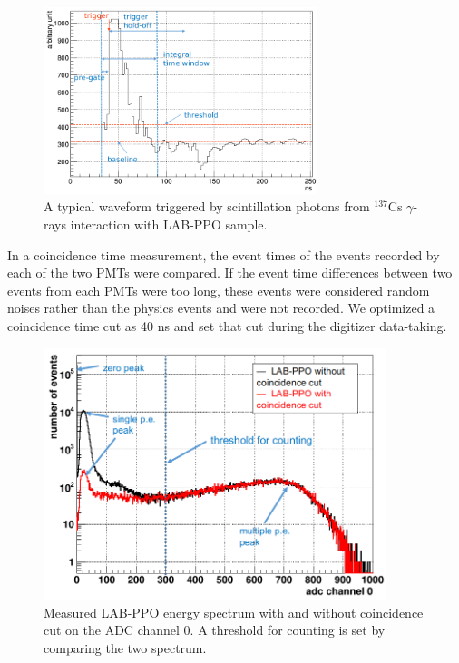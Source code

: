 \begin{figure}[htbp]
	\centering	
	\includegraphics[width=8cm]{teLS_waveform.png}
	\caption[A typical triggered waveform.]{A typical waveform triggered by scintillation photons from $^{137}$Cs $\gamma$-rays interaction with LAB-PPO sample.}
	\label{teLSwaveform}
\end{figure}

In a coincidence time measurement, the event times of the events recorded by each of the two PMTs were compared. If the event time differences between two events from each PMTs were too long, these events were considered random noises rather than the physics events and were not recorded. We optimized a coincidence time cut as 40 ns and set that cut during the digitizer data-taking. 

\begin{figure}[htbp]
	\centering	
	\includegraphics[width=10cm]{TeLScoinCut.png}
	\caption[Measured LAB-PPO energy spectrum with and without coincidence cut]{Measured LAB-PPO energy spectrum with and without coincidence cut on the ADC channel 0. A threshold for counting is set by comparing the two spectrum.}
	\label{teLScoinCut}
\end{figure}

